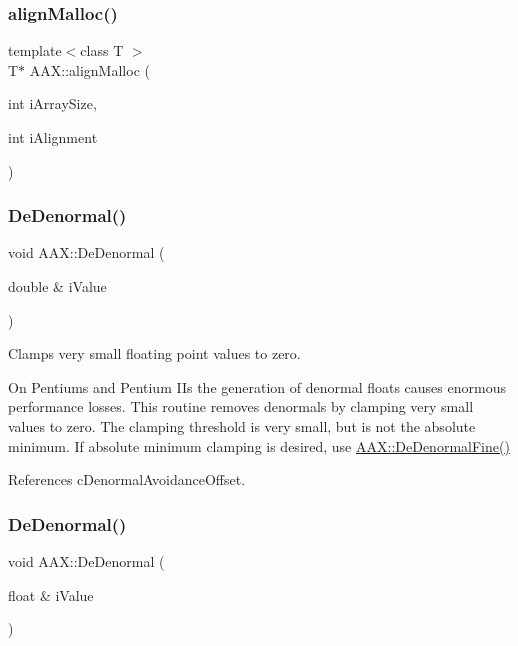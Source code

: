 \mbox{\label{a00852_aaa3236d90a0dbbf30150d8a181f2d66b}} 
\subsubsection{\texorpdfstring{alignMalloc()}{alignMalloc()}}
{\footnotesize\ttfamily template$<$class T $>$ \\
T$\ast$ A\+A\+X\+::align\+Malloc (\begin{DoxyParamCaption}\item[{int}]{i\+Array\+Size,  }\item[{int}]{i\+Alignment }\end{DoxyParamCaption})}

\mbox{\label{a00852_aaf103dc75b68b6c4f6792dd26f9b4fd0}} 
\subsubsection{\texorpdfstring{DeDenormal()}{DeDenormal()}\hspace{0.1cm}{\footnotesize\ttfamily [1/2]}}
{\footnotesize\ttfamily void A\+A\+X\+::\+De\+Denormal (\begin{DoxyParamCaption}\item[{double \&}]{i\+Value }\end{DoxyParamCaption})\hspace{0.3cm}{\ttfamily [inline]}}



Clamps very small floating point values to zero. 

On Pentiums and Pentium I\+Is the generation of denormal floats causes enormous performance losses. This routine removes denormals by clamping very small values to zero. The clamping threshold is very small, but is not the absolute minimum. If absolute minimum clamping is desired, use \mbox{\hyperlink{a00852_ac52b6214a1de32e59b90ddbc1878e515}{A\+A\+X\+::\+De\+Denormal\+Fine()}} 

References c\+Denormal\+Avoidance\+Offset.

\mbox{\label{a00852_aedfd1762f559291ceddd53f8ce8862a5}} 
\subsubsection{\texorpdfstring{DeDenormal()}{DeDenormal()}\hspace{0.1cm}{\footnotesize\ttfamily [2/2]}}
{\footnotesize\ttfamily void A\+A\+X\+::\+De\+Denormal (\begin{DoxyParamCaption}\item[{float \&}]{i\+Value }\end{DoxyParamCaption})\hspace{0.3cm}{\ttfamily [inline]}}



